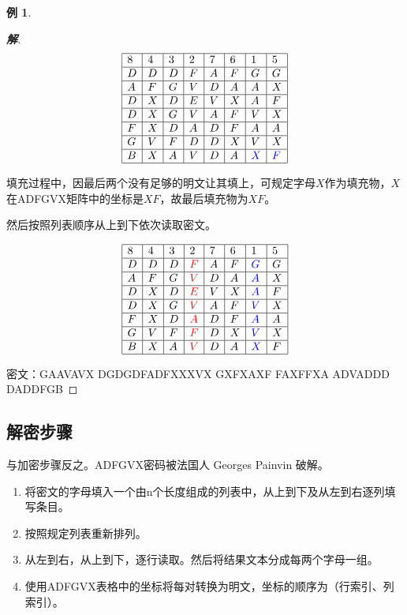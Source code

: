 \documentclass{article}
\theoremstyle{definition}
\newtheorem{example}{\indent 例}
\newenvironment{solution}{\begin{proof}[\indent\bf 解]}{\end{proof}}
\begin{document}
\begin{example}
\begin{solution}
$$
\begin{array}{|l|l|l|l|l|l|l|l|}
\hline 8 & 4 & 3 & 2 & 7 & 6 & 1 & 5 \\
\hline D&D &D &F &A &F &G &G \\
\hline A& F&G & V& D& A&A & X\\
\hline D& X&D & E& V& X&A & F\\
\hline D& X&G & V& A& F&V & X\\
\hline F& X&D & A& D& F&A & A\\
\hline G& V&F & D& D& X&V &X \\
\hline B& X& A&V &D &A &{\color{blue}X} &{\color{blue}F} \\
\hline
\end{array}
$$


填充过程中，因最后两个没有足够的明文让其填上，可规定字母$X$作为填充物，$X$在ADFGVX矩阵中的坐标是$XF$，故最后填充物为$XF$。

然后按照列表顺序从上到下依次读取密文。

$$
\begin{array}{|l|l|l|l|l|l|l|l|}
\hline 8 & 4 & 3 & 2 & 7 & 6 & 1 & 5 \\
\hline D&D &D &{\color{red}F} &A &F &{\color{blue}G} &G \\
\hline A& F&G & {\color{red}V}& D& A&{\color{blue}A} & X\\
\hline D& X&D & {\color{red}E}& V& X&{\color{blue}A} & F\\
\hline D& X&G & {\color{red}V}& A& F&{\color{blue}V} & X\\
\hline F& X&D & {\color{red}A}& D& F&{\color{blue}A} & A\\
\hline G& V&F & {\color{red}F}& D& X&{\color{blue}V} &X \\
\hline B& X& A&{\color{red}V} &D &A &{\color{blue}X} &F \\
\hline
\end{array}
$$

密文：{\color{blue}GAAVAVX}  \quad DGDGDFA\quad DFXXXVX \quad  GXFXAXF \quad FAXFFXA \quad ADVADDD \quad DADDFGB 
\end{solution}
\end{example}

\subsection{解密步骤}

与加密步骤反之。ADFGVX密码被法国人 Georges Painvin 破解。

\begin{enumerate}
\item 将密文的字母填入一个由n个长度组成的列表中，从上到下及从左到右逐列填写条目。
\item 按照规定列表重新排列。
\item 从左到右，从上到下，逐行读取。然后将结果文本分成每两个字母一组。
\item 使用ADFGVX表格中的坐标将每对转换为明文，坐标的顺序为（行索引、列索引）。
\end{enumerate}
\end{document}
